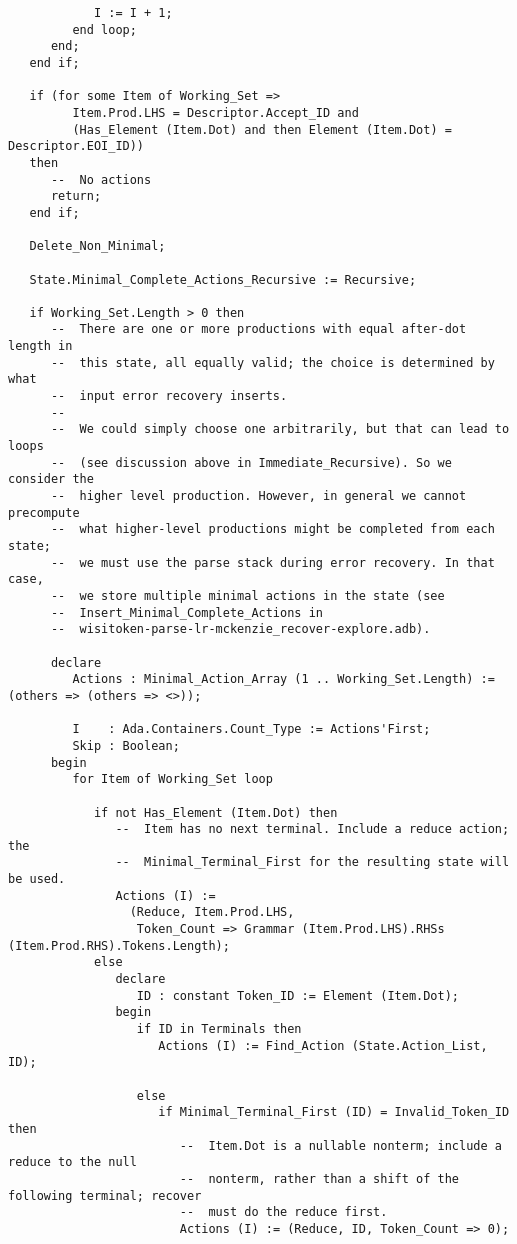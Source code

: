 \documentclass{article}
\begin{document}
\begin{lstlisting}
            I := I + 1;
         end loop;
      end;
   end if;

   if (for some Item of Working_Set =>
         Item.Prod.LHS = Descriptor.Accept_ID and
         (Has_Element (Item.Dot) and then Element (Item.Dot) = Descriptor.EOI_ID))
   then
      --  No actions
      return;
   end if;

   Delete_Non_Minimal;

   State.Minimal_Complete_Actions_Recursive := Recursive;

   if Working_Set.Length > 0 then
      --  There are one or more productions with equal after-dot length in
      --  this state, all equally valid; the choice is determined by what
      --  input error recovery inserts.
      --
      --  We could simply choose one arbitrarily, but that can lead to loops
      --  (see discussion above in Immediate_Recursive). So we consider the
      --  higher level production. However, in general we cannot precompute
      --  what higher-level productions might be completed from each state;
      --  we must use the parse stack during error recovery. In that case,
      --  we store multiple minimal actions in the state (see
      --  Insert_Minimal_Complete_Actions in
      --  wisitoken-parse-lr-mckenzie_recover-explore.adb).

      declare
         Actions : Minimal_Action_Array (1 .. Working_Set.Length) := (others => (others => <>));

         I    : Ada.Containers.Count_Type := Actions'First;
         Skip : Boolean;
      begin
         for Item of Working_Set loop

            if not Has_Element (Item.Dot) then
               --  Item has no next terminal. Include a reduce action; the
               --  Minimal_Terminal_First for the resulting state will be used.
               Actions (I) :=
                 (Reduce, Item.Prod.LHS,
                  Token_Count => Grammar (Item.Prod.LHS).RHSs (Item.Prod.RHS).Tokens.Length);
            else
               declare
                  ID : constant Token_ID := Element (Item.Dot);
               begin
                  if ID in Terminals then
                     Actions (I) := Find_Action (State.Action_List, ID);

                  else
                     if Minimal_Terminal_First (ID) = Invalid_Token_ID then
                        --  Item.Dot is a nullable nonterm; include a reduce to the null
                        --  nonterm, rather than a shift of the following terminal; recover
                        --  must do the reduce first.
                        Actions (I) := (Reduce, ID, Token_Count => 0);


\end{lstlisting}
\end{document}
